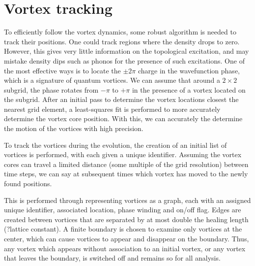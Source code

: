  \section{Vortex tracking}
 To efficiently follow the vortex dynamics, some robust algorithm is needed to track their positions. One could track regions where the density drops to zero. However, this gives very little information on the topological excitation, and may mistake density dips such as phonos for the presence of such excitations. One of the most effective ways is to locate the $\pm 2\pi$ charge in the wavefunction phase, which is a signature of quantum vortices. We can assume that around a $2\times 2$ subgrid, the phase rotates from $-\pi$ to $+\pi$ in the presence of a vortex located on the subgrid. After an initial pass to determine the vortex locations closest the nearest grid element, a least-squares fit is performed to more accurately determine the vortex core position. With this, we can accurately the determine the motion of the vortices with high precision.

 To track the vortices during the evolution, the creation of an initial list of vortices is performed, with each given a unique identifier. Assuming the vortex cores can travel a limited distance (some multiple of the grid resolution) between time steps, we can say at subsequent times which vortex has moved to the newly found positions.

 This is performed through representing vortices as a graph, each with an assigned unique identifier, associated location, phase winding and on/off flag. Edges are created between vortices that are separated by at most double the healing length (?lattice constant). A finite boundary is chosen to examine only vortices at the center, which can cause vortices to appear and disappear on the boundary. Thus, any vortex which appears without association to an initial vortex, or any vortex that leaves the boundary, is switched off and remains so for all analysis.
